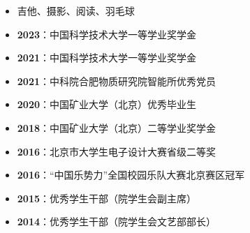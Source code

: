   \begin{itemize}[leftmargin=*]
    \item 吉他、摄影、阅读、羽毛球
    \item \textbf{2023}：中国科学技术大学一等学业奖学金
    \item \textbf{2021}：中国科学技术大学一等学业奖学金
    \item \textbf{2021}：中科院合肥物质研究院智能所优秀党员
    \item \textbf{2020}：中国矿业大学（北京）优秀毕业生
    \item \textbf{2018}：中国矿业大学（北京）二等学业奖学金
    \item \textbf{2016}：北京市大学生电子设计大赛省级二等奖
    \item \textbf{2016}：“中国乐势力”全国校园乐队大赛北京赛区冠军
    \item \textbf{2015}：优秀学生干部（院学生会副主席）
    \item \textbf{2014}：优秀学生干部（院学生会文艺部部长）
  \end{itemize}
